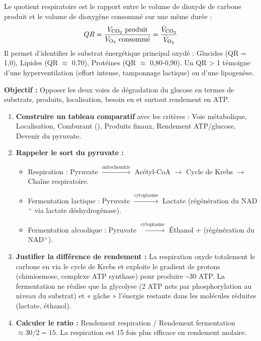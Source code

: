 \documentclass[11pt]{article}
\begin{document}
\begin{definition}
    Le quotient respiratoire est le rapport entre le volume de dioxyde de carbone produit et le volume de dioxygène consommé sur une même durée :
    \[ QR = \frac{V_{\ce{CO2}}\text{ produit}}{V_{\ce{O2}}\text{ consommé}} = \frac{\dot{V}_{\ce{CO2}}}{\dot{V}_{\ce{O2}}} \]
    Il permet d'identifier le substrat énergétique principal oxydé : Glucides (QR = 1,0), Lipides (QR $\approx$ 0,70), Protéines (QR $\approx$ 0,80-0,90). Un QR > 1 témoigne d'une hyperventilation (effort intense, tamponnage lactique) ou d'une lipogenèse.
\end{definition}

\begin{methode}
    \textbf{Objectif :} Opposer les deux voies de dégradation du glucose en termes de substrats, produits, localisation, besoin en  et surtout rendement en ATP.
    \begin{enumerate}
        \item \textbf{Construire un tableau comparatif} avec les critères : Voie métabolique, Localisation, Comburant (), Produits finaux, Rendement ATP/glucose, Devenir du pyruvate.
        \item \textbf{Rappeler le sort du pyruvate :}
              \begin{itemize}
                  \item Respiration : Pyruvate $\xrightarrow{\text{mitochondrie}}$ Acétyl-CoA $\to$ Cycle de Krebs $\to$ Chaîne respiratoire.
                  \item Fermentation lactique : Pyruvate $\xrightarrow{\text{cytoplasme}}$ Lactate (régénération du NAD$^+$ via lactate déshydrogénase).
                  \item Fermentation alcoolique : Pyruvate $\xrightarrow{\text{cytoplasme}}$ Éthanol +  (régénération du NAD$^+$).
              \end{itemize}
        \item \textbf{Justifier la différence de rendement :} La respiration oxyde totalement le carbone en  via le cycle de Krebs et exploite le gradient de protons (chimiosmose, complexe ATP synthase) pour produire \num{~30} ATP. La fermentation ne réalise que la glycolyse (2 ATP nets par phosphorylation au niveau du substrat) et « gâche » l'énergie restante dans les molécules réduites (lactate, éthanol).
        \item \textbf{Calculer le ratio :} Rendement respiration / Rendement fermentation $\approx 30 / 2 = 15$. La respiration est 15 fois plus efficace en rendement molaire.
    \end{enumerate}
\end{methode}
\end{document}
